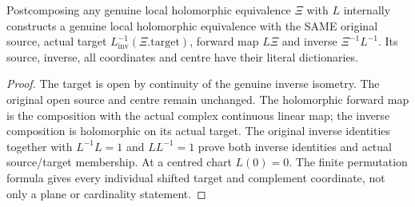 \begin{lemma}
\label{hir:submersion-adapted-holomorphic-postcomposition}
\leanok
{}
\uses{}

Postcomposing any genuine local holomorphic equivalence $\Xi$ with $L$ internally constructs a genuine local holomorphic equivalence with the SAME original source, actual target $L^{-1}_{\mathrm{inv}}(\Xi.\mathrm{target})$, forward map $L\Xi$ and inverse $\Xi^{-1}L^{-1}$. Its source, inverse, all coordinates and centre have their literal dictionaries.
\end{lemma}
\begin{proof}
The target is open by continuity of the genuine inverse isometry. The original open source and centre remain unchanged. The holomorphic forward map is the composition with the actual complex continuous linear map; the inverse composition is holomorphic on its actual target. The original inverse identities together with $L^{-1}L=1$ and $LL^{-1}=1$ prove both inverse identities and actual source/target membership. At a centred chart $L(0)=0$. The finite permutation formula gives every individual shifted target and complement coordinate, not only a plane or cardinality statement.
\end{proof}


